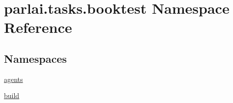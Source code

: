 \hypertarget{namespaceparlai_1_1tasks_1_1booktest}{}\section{parlai.\+tasks.\+booktest Namespace Reference}
\label{namespaceparlai_1_1tasks_1_1booktest}
\subsection*{Namespaces}
\begin{DoxyCompactItemize}
\item 
 \hyperlink{namespaceparlai_1_1tasks_1_1booktest_1_1agents}{agents}
\item 
 \hyperlink{namespaceparlai_1_1tasks_1_1booktest_1_1build}{build}
\end{DoxyCompactItemize}

